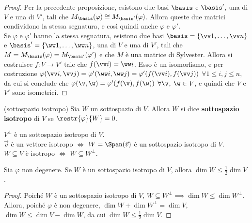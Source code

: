 \documentclass[11pt]{article}
\begin{document}
	\begin{proof}\nl\nl
		\rightproof Per la precedente proposizione, esistono due basi $\basis$ e $\basis'$, una di $V$ e una di $V'$,
		tali che $M_\basis(\varphi) \cong M_{\basis'}(\varphi)$. Allora queste due matrici condividono la stessa
		segnatura, e così quindi anche $\varphi$ e $\varphi'$. \\

		\leftproof Se $\varphi$ e $\varphi'$ hanno la stessa segnatura, esistono due basi $\basis = \{ \vv 1, \ldots, \vv n \}$ e $\basis' = \{ \ww 1, \ldots, \ww n \}$, una
		di $V$ e una di $V'$, tali che $M = M_\basis(\varphi) = M_{\basis'}(\varphi')$ e che $M$ è una matrice di
		Sylvester. Allora si costruisce $f : V \to V'$ tale che $f(\vv i) = \ww i$. Esso è un isomorfismo, e per
		costruzione $\varphi(\vv i, \vv j) = \varphi'(\ww i, \ww j) = \varphi'(f(\vv i), f(\vv j))$ $\forall 1 \leq i, j \leq n$, da cui
		si conclude che $\varphi(\v, \w) = \varphi'(f(\v), f(\w))$ $\forall \v$, $\w \in V$, e quindi che $V$ e
		$V'$ sono isometrici.
	\end{proof}


	\begin{definition} (sottospazio isotropo)
		Sia $W$ un sottospazio di $V$. Allora $W$ si dice \textbf{sottospazio isotropo} di $V$
		se $\restr{\varphi}{W} = 0$.
	\end{definition}

	\begin{remark}\nl
		\li $V^\perp$ è un sottospazio isotropo di $V$. \\
		\li $\vec{v}$ è un vettore isotropo $\iff$ $W = \Span(\vec v)$ è un sottospazio isotropo di $V$. \\
		\li $W \subseteq V$ è isotropo $\iff$ $W \subseteq W^\perp$.
	\end{remark}

	\begin{proposition}
		Sia $\varphi$ non degenere. Se $W$ è un sottospazio isotropo di $V$, allora
		$\dim W \leq \frac{1}{2} \dim V$.
	\end{proposition}

	\begin{proof}
		Poiché $W$ è un sottospazio isotropo di $V$, $W \subseteq W^\perp \implies \dim W \leq \dim W^\perp$.
		Allora, poiché $\varphi$ è non degenere, $\dim W + \dim W^\perp = \dim V$, $\dim W \leq \dim V - \dim W$,
		da cui $\dim W \leq \frac{1}{2} \dim V$.
	\end{proof}
\end{document}
